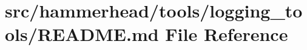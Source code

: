 \hypertarget{tools_2logging__tools_2README_8md}{}\section{src/hammerhead/tools/logging\+\_\+tools/\+R\+E\+A\+D\+ME.md File Reference}
\label{tools_2logging__tools_2README_8md}
